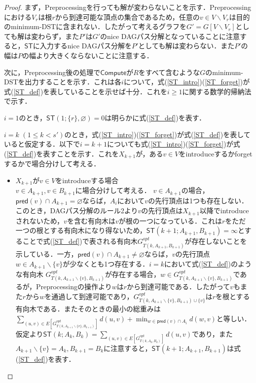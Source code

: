 \begin{proof}
    まず，Preprocessingを行っても解が変わらないことを示す．Preprocessingにおける$V_r$は根$r$から到達可能な頂点の集合であるため，任意の$v \in V \backslash V_r$は目的のminimum-DSTに含まれない．したがって考えるグラフを$G' = G[V \backslash V_r]$としても解は変わらず，また$P'$は$G'$のnice DAGパス分解となっていることに注意すると，$\mathsf{ST}$に入力するnice DAGパス分解を$P'$としても解は変わらない．また$P'$の幅は$P$の幅より大きくならないことに注意する．

    次に，Preprocessing後の処理で$\mathsf{Compute}$が$R$をすべて含むような$G$のminimum-DSTを出力することを示す．これは各$i$について，式(\ref{ST_intro})(\ref{ST_forget})が式(\ref{ST_def})を表していることを示せば十分．これを$i \geq 1$に関する数学的帰納法で示す．    
 
    
    $i=1$のとき，$\mathsf{ST}(1; \{r\}, \varnothing) = 0$は明らかに式(\ref{ST_def})を表す．
    
    $i=k$ $(1 \leq k < s')$のとき，式(\ref{ST_intro})(\ref{ST_forget})が式(\ref{ST_def})を表していると仮定する．以下で$i = k+1$についても式(\ref{ST_intro})(\ref{ST_forget})が式(\ref{ST_def})を表すことを示す．これを$X_{k+1}$が，ある$v \in V$をintroduceするかforgetするかで場合分けして考える．

    
    \begin{itemize}
        \item $X_{k+1}$が$v \in V$をintroduceする場合 \\
        $v \in A_{k+1}, v \in B_{k+1}$に場合分けして考える．
        $v \in A_{k+1}$の場合，$\mathsf{pred}(v) \cap A_{k+1} = \varnothing$ならば，$A_i$において$v$の先行頂点は1つも存在しない．このとき，DAGパス分解のルール2より$v$の先行頂点は$X_{k+1}$以降でintroduceされないため，$v$を含む有向木は$v$が根の一つになっている．これは$r$をただ一つの根とする有向木になり得ないため，$\mathsf{ST}(k+1; A_{k+1}, B_{k+1}) = \infty$とすることで式(\ref{ST_def})で表される有向木$G^{opt}_{T(k, A_{k+1}, B_{k+1})}$が存在しないことを示している．一方，$\mathsf{pred}(v) \cap A_{k+1} \neq \varnothing$ならば，$v$の先行頂点$w \in A_{k+1} \backslash \{v\}$が少なくとも1つ存在する．$i=k$において式(\ref{ST_def})のような有向木 $G^{opt}_{T(k, A_{k+1} \backslash \{v\}, B_{k+1})}$が存在する場合，$w \in G^{opt}_{T(k,A_{k+1} \backslash \{v\}, B_{k+1})}$であるが，Preprocessingの操作より$w$は$r$から到達可能である．したがって$v$もまた$r$から$w$を通過して到達可能であり，$G^{opt}_{T(k, A_{k+1} \backslash \{v\}, B_{k+1}) \cup \{v\}}$は$r$を根とする有向木である．またそのときの最小の総重みは$ \sum_{(u, v) \in E[G^{opt}_{T(k, A_{k+1} \backslash \{v\}, B_{k+1})}]} d(u, v) + \displaystyle \min_{w \in \mathsf{pred}(v) \cap A_i} d(w, v)$と等しい．仮定より$\mathsf{ST}(k; A_k, B_k) =  \sum_{(u, v) \in E[G^{opt}_{T(k, A_k, B_k)}]} d(u, v)$であり，また$A_{k+1} \backslash \{v\} = A_k, B_{k+1} = B_k$に注意すると，$\mathsf{ST}(k+1; A_{k+1}, B_{k+1})$は式(\ref{ST_def})を表す．


\end{itemize}
\end{proof}
